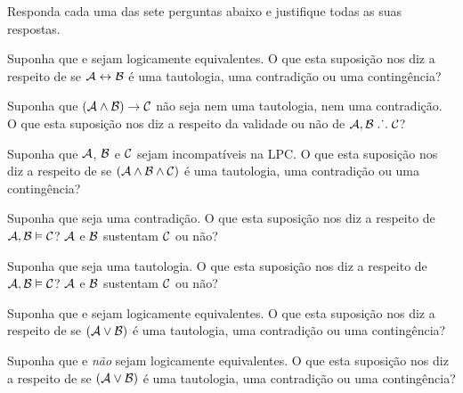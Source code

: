 \solutions
\problempart
\label{pr.TT.concepts}
Responda cada uma das sete perguntas abaixo e justifique todas as suas respostas.
\begin{earg}
\item Suponha que   e  sejam logicamente equivalentes.
O que esta suposição nos diz a respeito de se $\mathcal{A}\leftrightarrow\mathcal{B}$ é uma tautologia, uma contradição ou uma contingência?
\item Suponha que $(\mathcal{A}\wedge\mathcal{B})\rightarrow\mathcal{C}$ não seja nem uma tautologia, nem uma contradição.
O que esta suposição nos diz a respeito da validade ou não de $\mathcal{A}, \mathcal{B} \mathrel{\ldotp\dot{}\,\ldotp}\mathcal{C}$?
\item Suponha que  $\mathcal{A}$, $\mathcal{B}$ e $\mathcal{C}$ sejam incompatíveis na LPC.
O que esta suposição nos diz a respeito de se $(\mathcal{A}\wedge\mathcal{B}\wedge\mathcal{C})$ é uma tautologia, uma contradição ou uma contingência?
\item Suponha que  seja uma contradição.
O que esta suposição nos diz a respeito de $\mathcal{A}, \mathcal{B} \vDash \mathcal{C}$?
$\mathcal{A}$ e $\mathcal{B}$ sustentam $\mathcal{C}$ ou não?
\item Suponha que  seja uma tautologia. 
O que esta suposição nos diz a respeito de $\mathcal{A}, \mathcal{B}\vDash \mathcal{C}$?
$\mathcal{A}$ e $\mathcal{B}$ sustentam $\mathcal{C}$ ou não?
\item Suponha que  e  sejam logicamente equivalentes.
O que esta suposição nos diz a respeito de se $(\mathcal{A}\vee\mathcal{B})$ é uma tautologia, uma contradição ou uma contingência?
\item Suponha que   e  \emph{não} sejam logicamente equivalentes.
O que esta suposição nos diz a respeito de se $(\mathcal{A}\vee\mathcal{B})$ é uma tautologia, uma contradição ou uma contingência?
\end{earg}
